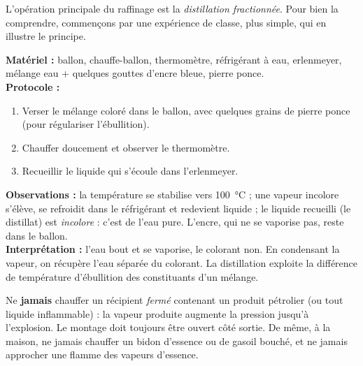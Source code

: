 \documentclass[11pt]{article}
\newcommand{\cle}[1]{{\popxbold\color{popdark}#1}}
\begin{document}
L'opération principale du raffinage est la \emph{distillation fractionnée}. Pour bien la comprendre, commençons par une expérience de classe, plus simple, qui en illustre le principe.

\begin{experience}
\textbf{Matériel :} ballon, chauffe-ballon, thermomètre, réfrigérant à eau, erlenmeyer, mélange eau + quelques gouttes d'encre bleue, pierre ponce.\\
\textbf{Protocole :}
\begin{enumerate}
\item Verser le mélange coloré dans le ballon, avec quelques grains de pierre ponce (pour régulariser l'ébullition).
\item Chauffer doucement et observer le thermomètre.
\item Recueillir le liquide qui s'écoule dans l'erlenmeyer.
\end{enumerate}
\textbf{Observations :} la température se stabilise vers \SI{100}{\celsius} ; une vapeur incolore s'élève, se refroidit dans le réfrigérant et redevient liquide ; le liquide recueilli (le \cle{distillat}) est \emph{incolore} : c'est de l'eau pure. L'encre, qui ne se vaporise pas, reste dans le ballon.\\
\textbf{Interprétation :} l'eau bout et se vaporise, le colorant non. En condensant la vapeur, on récupère l'eau séparée du colorant. La distillation exploite la différence de \cle{température d'ébullition} des constituants d'un mélange.
\end{experience}

\begin{attention}
Ne \textbf{jamais} chauffer un récipient \emph{fermé} contenant un produit pétrolier (ou tout liquide inflammable) : la vapeur produite augmente la pression jusqu'à l'\cle{explosion}. Le montage doit toujours être ouvert côté sortie. De même, à la maison, ne jamais chauffer un bidon d'essence ou de gasoil bouché, et ne jamais approcher une flamme des vapeurs d'essence.
\end{attention}
\end{document}
